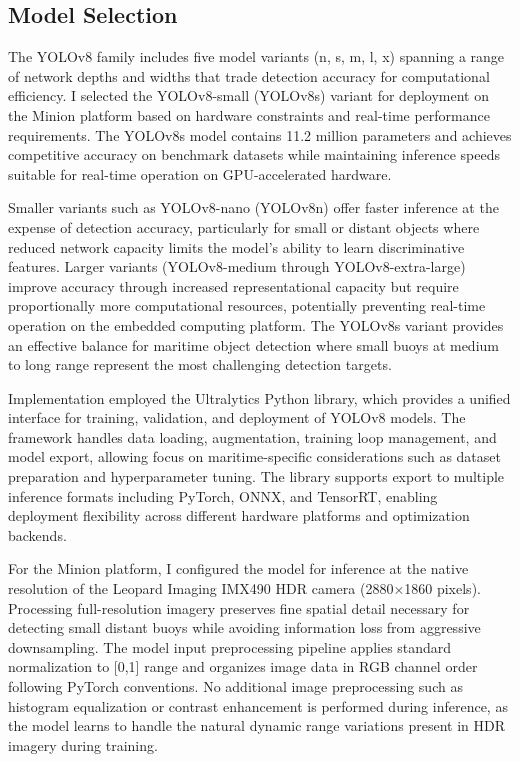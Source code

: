 \subsection{Model Selection} \label{sec:yolo_model_selection}

The YOLOv8 family includes five model variants (n, s, m, l, x) spanning a range of network depths and widths that trade detection accuracy for computational efficiency.
I selected the YOLOv8-small (YOLOv8s) variant for deployment on the Minion platform based on hardware constraints and real-time performance requirements.
The YOLOv8s model contains 11.2 million parameters and achieves competitive accuracy on benchmark datasets while maintaining inference speeds suitable for real-time operation on GPU-accelerated hardware.

Smaller variants such as YOLOv8-nano (YOLOv8n) offer faster inference at the expense of detection accuracy, particularly for small or distant objects where reduced network capacity limits the model's ability to learn discriminative features.
Larger variants (YOLOv8-medium through YOLOv8-extra-large) improve accuracy through increased representational capacity but require proportionally more computational resources, potentially preventing real-time operation on the embedded computing platform.
The YOLOv8s variant provides an effective balance for maritime object detection where small buoys at medium to long range represent the most challenging detection targets.

Implementation employed the Ultralytics Python library, which provides a unified interface for training, validation, and deployment of YOLOv8 models.
The framework handles data loading, augmentation, training loop management, and model export, allowing focus on maritime-specific considerations such as dataset preparation and hyperparameter tuning.
The library supports export to multiple inference formats including PyTorch, ONNX, and TensorRT, enabling deployment flexibility across different hardware platforms and optimization backends.

For the Minion platform, I configured the model for inference at the native resolution of the Leopard Imaging IMX490 \ac{HDR} camera (2880×1860 pixels).
Processing full-resolution imagery preserves fine spatial detail necessary for detecting small distant buoys while avoiding information loss from aggressive downsampling.
The model input preprocessing pipeline applies standard normalization to [0,1] range and organizes image data in RGB channel order following PyTorch conventions.
No additional image preprocessing such as histogram equalization or contrast enhancement is performed during inference, as the model learns to handle the natural dynamic range variations present in \ac{HDR} imagery during training.

